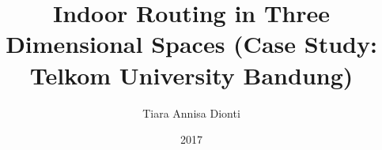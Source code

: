 \documentclass[a4paper,12pt,oneside]{book}
\title{Indoor Routing in Three Dimensional Spaces 
	(Case Study: Telkom University Bandung)
}\let\Title\@title   %
\author{Tiara Annisa Dionti}  \let\Author\@author  %
\date{2017}           \let\Date\@date %
\newif\iflogTA
\begin{document}
\begin{titlepage}
\thispagestyle{empty}

\pagebreak
\thispagestyle{empty}

\pagebreak
\end{titlepage}
%
\iflogTA
\pagebreak
\addcontentsline{toc}{chapter}{Abstract}

\pagebreak
\addcontentsline{toc}{chapter}{Declaration Sheet}

\pagebreak
\addcontentsline{toc}{chapter}{Acknowledgement}

\pagebreak
\addcontentsline{toc}{chapter}{Preface}

\pagebreak
\fi
\cleardoublepage
{}
\tableofcontents
\iflogTA
\newpage
\cleardoublepage
\addcontentsline{toc}{chapter}{List of Figures}
\listoffigures
\newpage
\cleardoublepage
\addcontentsline{toc}{chapter}{List of Table}
\listoftables
\fi
%
\cleardoublepage
{}

%

%

%

%

%
\cleardoublepage
{}


%
\cleardoublepage
{}

\end{document}
